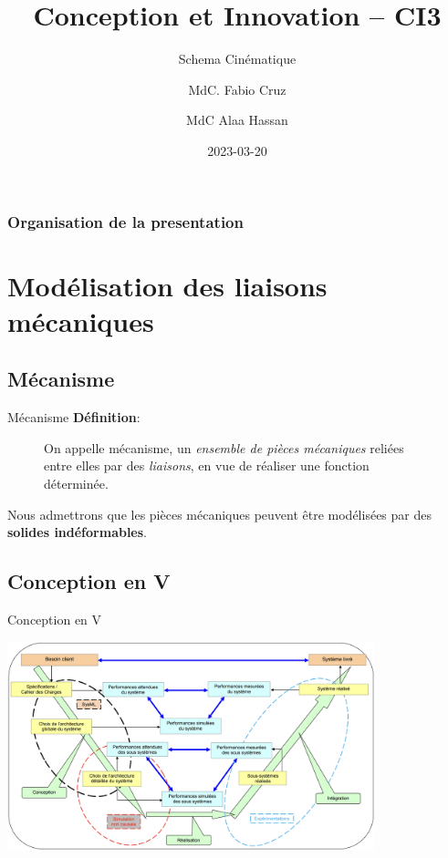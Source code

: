\documentclass[
  ignorenonframetext,
  aspectratio=169,
  c]{beamer}
\title{Conception et Innovation -- CI3}
\subtitle{Schema Cinématique}
\author{MdC. Fabio Cruz \and MdC Alaa Hassan}
\date{2023-03-20}
\institute{Université de Lorraine \textbar{} ENSGSI}
\renewcommand*\contentsname{Table of contents}
\newcommand\contentsname{Table of contents}
\begin{document}
\frame{\titlepage}

\renewcommand*\contentsname{Organisation de la presentation}
\begin{frame}[allowframebreaks]
  \frametitle{Organisation de la presentation}
  \tableofcontents[hideallsubsections]
\end{frame}
\section{Modélisation des liaisons
mécaniques}\label{moduxe9lisation-des-liaisons-muxe9caniques}

\subsection{Mécanisme}\label{muxe9canisme}

\begin{frame}{Mécanisme}
\textbf{Définition}:

\begin{figure}

\begin{minipage}{0.68\linewidth}
On appelle mécanisme, un \emph{ensemble de pièces mécaniques} reliées
entre elles par des \emph{liaisons}, en vue de réaliser une fonction
déterminée.\end{minipage}%

\end{figure}%

\pause

Nous admettrons que les pièces mécaniques peuvent être modélisées par
des \textbf{solides indéformables}.
\end{frame}

\subsection{Conception en V}\label{conception-en-v}

\begin{frame}{Conception en V}
\begin{center}
\includegraphics[width=0.8\textwidth,height=\textheight]{CM3/System-design.png}
\end{center}
\end{frame}
\end{document}
